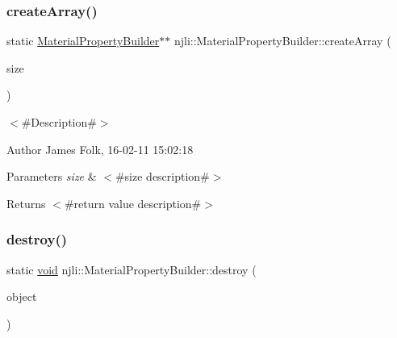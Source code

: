 \subsubsection{\texorpdfstring{create\+Array()}{createArray()}}
{\footnotesize\ttfamily static \mbox{\hyperlink{classnjli_1_1_material_property_builder}{Material\+Property\+Builder}}$\ast$$\ast$ njli\+::\+Material\+Property\+Builder\+::create\+Array (\begin{DoxyParamCaption}\item[{const \mbox{\hyperlink{_util_8h_a10e94b422ef0c20dcdec20d31a1f5049}{u32}}}]{size }\end{DoxyParamCaption})\hspace{0.3cm}{\ttfamily [static]}}



$<$\#\+Description\#$>$ 

\begin{DoxyAuthor}{Author}
James Folk, 16-\/02-\/11 15\+:02\+:18
\end{DoxyAuthor}

\begin{DoxyParams}{Parameters}
{\em size} & $<$\#size description\#$>$\\
\hline
\end{DoxyParams}
\begin{DoxyReturn}{Returns}
$<$\#return value description\#$>$ 
\end{DoxyReturn}
\mbox{\label{classnjli_1_1_material_property_builder_a89e5c5f1f121cd2f91e44a3c757db275}} 
\subsubsection{\texorpdfstring{destroy()}{destroy()}}
{\footnotesize\ttfamily static \mbox{\hyperlink{_thread_8h_af1e856da2e658414cb2456cb6f7ebc66}{void}} njli\+::\+Material\+Property\+Builder\+::destroy (\begin{DoxyParamCaption}\item[{\mbox{\hyperlink{classnjli_1_1_material_property_builder}{Material\+Property\+Builder}} $\ast$}]{object }\end{DoxyParamCaption})\hspace{0.3cm}{\ttfamily [static]}}



